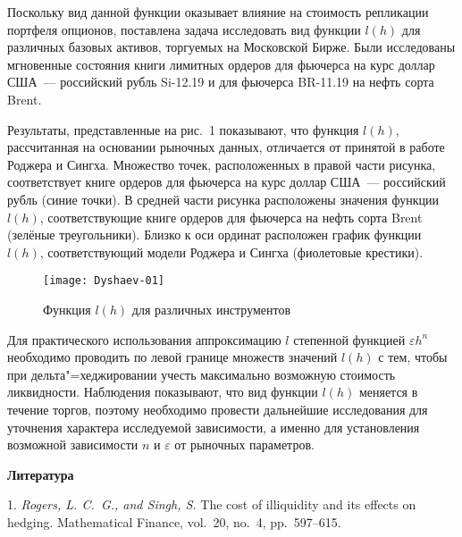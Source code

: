 Поскольку вид данной функции оказывает влияние на стоимость репликации портфеля опционов,  поставлена задача исследовать вид функции $l(h)$ для различных базовых активов, торгуемых на Московской Бирже. Были исследованы мгновенные состояния книги лимитных ордеров для фьючерса на курс доллар США~--- российский рубль Si-12.19 и для фьючерса BR-11.19 на нефть сорта Brent.

Результаты, представленные на рис.~1 показывают, что функция  $l(h)$, рассчитанная на основании рыночных данных, отличается от принятой в работе Роджера и Сингха. Множество точек, расположенных в правой части рисунка, соответствует книге ордеров для фьючерса на курс доллар США~--- российский рубль (синие точки). В средней части рисунка расположены значения функции $l(h)$, соответствующие книге ордеров для фьючерса на нефть сорта Brent (зелёные треугольники). Близко к оси ординат расположен график функции $l(h)$, соответствующий модели Роджера и Сингха (фиолетовые крестики).
\begin{figure}
	\centering
	\texttt{[image: Dyshaev-01]}
	\caption{\footnotesize Функция $l(h)$ для различных инструментов}
	\label{fig:dyshaev-01}
\end{figure}

Для практического использования аппроксимацию $l$ степенной функцией $\varepsilon h^n$ необходимо проводить по левой границе множеств значений $l(h)$ с тем, чтобы при дельта"=хед\-жи\-ро\-ва\-нии учесть максимально возможную стоимость ликвидности. Наблюдения показывают, что вид функции $l(h)$ меняется в течение торгов, поэтому необходимо провести дальнейшие исследования для уточнения характера исследуемой зависимости, а именно для установления возможной зависимости  $n$ и $\varepsilon$ от  рыночных параметров.

\smallskip \centerline {\bf Литература} \nopagebreak

1. {\it Rogers, L. C.~G., and Singh, S.} The cost of illiquidity and its effects on hedging. Mathematical Finance, vol.~20, no.~4, pp.~597--615.
